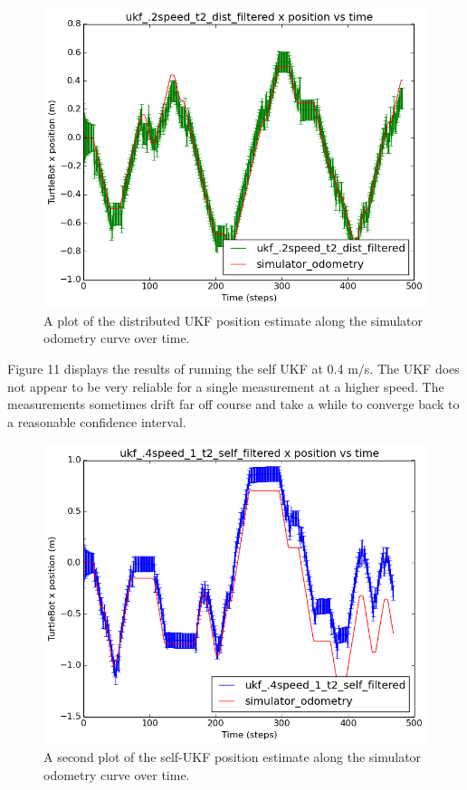 \documentclass[conference]{IEEEtran} \usepackage[T1]{fontenc} \usepackage[backend=biber, style=ieee]{biblatex}
\begin{document}
\begin{figure}[!ht]
\label{pic10} 
\centering 
\includegraphics[scale=.45]{ukf_2speed_t2_dist_filtered_pos_err_graph}
\caption {A plot of the distributed UKF position estimate along the simulator odometry curve over time.}
\end{figure}


Figure 11 displays the results of running the self UKF at 0.4 m/s. The UKF does not 
appear to be very reliable for a single measurement at a higher speed. The measurements 
sometimes drift far off course and take a while to converge back to a reasonable 
confidence interval.

\begin{figure}[!ht]
\label{pic11} 
\centering 
\includegraphics[scale=.45]{ukf_4speed_1_t2_self_filtered_pos_err_graph}
\caption {A second plot of the self-UKF position estimate along the simulator 
odometry curve over time.}
\end{figure}
\end{document}
